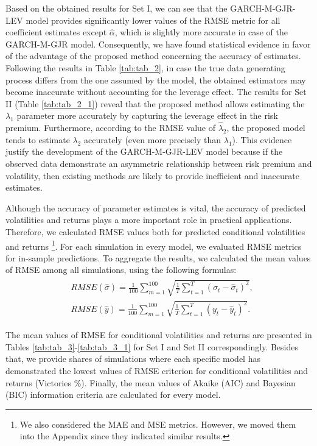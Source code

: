 \documentclass[authoryear, 1p]{elsarticle}
\numberwithin{equation}{section}
\begin{document}
Based on the obtained results for Set I, we can see that the GARCH-M-GJR-LEV model provides significantly lower values of the RMSE metric for all coefficient estimates except $\hat{\alpha}$, which is slightly more accurate in case of the GARCH-M-GJR model. Consequently, we have found statistical evidence in favor of the advantage of the proposed method concerning the accuracy of estimates. Following the results in Table \ref{tab:tab_2}, in case the true data generating process differs from the one assumed by the model, the obtained estimators may become inaccurate without accounting for the leverage effect. The results for Set II (Table \ref{tab:tab_2_1}) reveal that the proposed method allows estimating the $\lambda_1$ parameter more accurately by capturing the leverage effect in the risk premium. Furthermore, according to the RMSE value of $\hat{\lambda}_2$, the proposed model tends to estimate $\lambda_{2}$ accurately (even more precisely than $\lambda_{1}$). This evidence justify the development of the GARCH-M-GJR-LEV model because if the observed data demonstrate an asymmetric relationship between risk premium and volatility, then existing methods are likely to provide inefficient and inaccurate estimates.

Although the accuracy of parameter estimates is vital, the accuracy of predicted volatilities and returns plays a more important role in practical applications. Therefore, we calculated RMSE values both for predicted conditional volatilities and returns \footnote{We also considered the MAE and MSE metrics. However, we moved them into the Appendix since they indicated similar results.}. For each simulation in every model, we evaluated RMSE metrics for in-sample predictions. To aggregate the results, we calculated the mean values of RMSE among all simulations, using the following formulas:
\begin{align}
\begin{split}
&RMSE(\hat{\sigma}) = \frac{1}{100}\sum_{m = 1}^{100} \sqrt{\frac{1}{T} \sum_{t = 1}^{T}\left(\sigma_{t} - \hat{\sigma}_{t}\right)^2}, \\
&RMSE(\hat{y}) = \frac{1}{100}\sum_{m = 1}^{100} \sqrt{\frac{1}{T} \sum_{t = 1}^{T}\left(y_{t} - \hat{y}_{t}\right)^2}.
\end{split}
\end{align}

The mean values of RMSE for conditional volatilities and returns are presented in Tables \ref{tab:tab_3}-\ref{tab:tab_3_1} for Set I and Set II correspondingly. Besides that, we provide shares of simulations where each specific model has demonstrated the lowest values of RMSE criterion for conditional volatilities and returns (Victories \%). Finally, the mean values of Akaike (AIC) and Bayesian (BIC) information criteria are calculated for every model.
\end{document}
